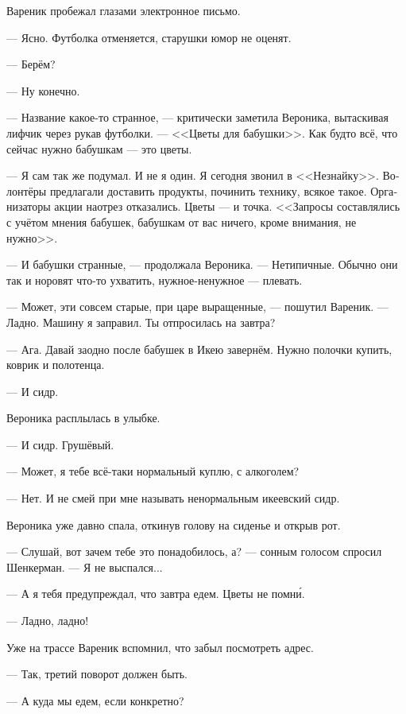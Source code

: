 \documentclass[a5paper,12pt,fleqn]{extbook}\usepackage{cooltooltips}\usepackage{polyglossia}\setdefaultlanguage[babelshorthands=true]{russian}\setotherlanguage{english}\defaultfontfeatures{Ligatures=TeX,Mapping=tex-text} \usepackage{xcolor}\definecolor{lightgray}{HTML}{bbbbbb}\color{lightgray}\newcommand{\ml}[3]{\textenglish{\textcolor{black}{#3}}}
\newcommand{\asterism}{\vspace{1em}{\centering\Large\bfseries$\ast~\ast~\ast$\par}\vspace{1em}}
\newcommand{\textspace}{\vspace{1em}{\centering\Large\bfseries<...>\par}\vspace{1em}}
\begin{document}
Вареник пробежал глазами электронное письмо.

--- Ясно.
Футболка отменяется, старушки юмор не оценят.

--- Берём?

--- Ну конечно.

\asterism

\textspace

--- Название какое-то странное, --- критически заметила Вероника, вытаскивая лифчик через рукав футболки.
--- <<Цветы для бабушки>>.
Как будто всё, что сейчас нужно бабушкам --- это цветы.

--- Я сам так же подумал.
И не я один.
Я сегодня звонил в <<Незнайку>>.
Волонтёры предлагали доставить продукты, починить технику, всякое такое.
Организаторы акции наотрез отказались.
Цветы --- и точка.
<<Запросы составлялись с учётом мнения бабушек, бабушкам от вас ничего, кроме внимания, не нужно>>.

--- И бабушки странные, --- продолжала Вероника.
--- Нетипичные.
Обычно они так и норовят что-то ухватить, нужное-ненужное --- плевать.

--- Может, эти совсем старые, при царе выращенные, --- пошутил Вареник.
--- Ладно.
Машину я заправил.
Ты отпросилась на завтра?

--- Ага.
Давай заодно после бабушек в Икею завернём.
Нужно полочки купить, коврик и полотенца.

--- И сидр.

Вероника расплылась в улыбке.

--- И сидр.
Грушёвый.

--- Может, я тебе всё-таки нормальный куплю, с алкоголем?

--- Нет.
И не смей при мне называть ненормальным икеевский сидр.

\asterism

\textspace

Вероника уже давно спала, откинув голову на сиденье и открыв рот.

--- Слушай, вот зачем тебе это понадобилось, а? --- сонным голосом спросил Шенкерман.
--- Я не выспался...

--- А я тебя предупреждал, что завтра едем.
Цветы не помн\'и.

--- Ладно, ладно!

Уже на трассе Вареник вспомнил, что забыл посмотреть адрес.

--- Так, третий поворот должен быть.

--- А куда мы едем, если конкретно?
\end{document}
